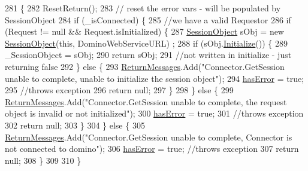 \begin{DoxyCode}
281                                                                 \{
282         ResetReturn();
283         \textcolor{comment}{// reset the error vars - will be populated by SessionObject}
284         \textcolor{keywordflow}{if} (\_isConnected) \{
285             \textcolor{comment}{//we have a valid Requestor}
286             \textcolor{keywordflow}{if} (Request != null && Request.isInitialized) \{
287                 \mbox{\hyperlink{class_session_object}{SessionObject}} sObj = \textcolor{keyword}{new} \mbox{\hyperlink{class_connector_a0a7bb42f9530796c086ab50785147ce9}{SessionObject}}(\textcolor{keyword}{this}, DominoWebServiceURL)
      ;
288                 \textcolor{keywordflow}{if} (sObj.\mbox{\hyperlink{class_session_object_af3b9c9d56d98c848061952ed935f815b}{Initialize}}()) \{
289                     \_SessionObject = sObj;
290                     \textcolor{keywordflow}{return} sObj;
291                     \textcolor{comment}{//not written in initialize - just returning false}
292                 \} \textcolor{keywordflow}{else} \{
293                     \mbox{\hyperlink{class_connector_a1ed422674b344524fd77998dcf6a9ba6}{ReturnMessages}}.Add(\textcolor{stringliteral}{"Connector.GetSession unable to complete, unable to
       initialize the session object"});
294                     \mbox{\hyperlink{class_connector_a079bae21a5417efa53bfe8954c0f533f}{hasError}} = \textcolor{keyword}{true};
295                     \textcolor{comment}{//throws exception}
296                     \textcolor{keywordflow}{return} null;
297                 \}
298             \} \textcolor{keywordflow}{else} \{
299                 \mbox{\hyperlink{class_connector_a1ed422674b344524fd77998dcf6a9ba6}{ReturnMessages}}.Add(\textcolor{stringliteral}{"Connector.GetSession unable to complete, the request
       object is invalid or not initialized"});
300                 \mbox{\hyperlink{class_connector_a079bae21a5417efa53bfe8954c0f533f}{hasError}} = \textcolor{keyword}{true};
301                 \textcolor{comment}{//throws exception}
302                 \textcolor{keywordflow}{return} null;
303             \}
304         \} \textcolor{keywordflow}{else} \{
305             \mbox{\hyperlink{class_connector_a1ed422674b344524fd77998dcf6a9ba6}{ReturnMessages}}.Add(\textcolor{stringliteral}{"Connector.GetSession unable to complete, Connector is not
       connected to domino"});
306             \mbox{\hyperlink{class_connector_a079bae21a5417efa53bfe8954c0f533f}{hasError}} = \textcolor{keyword}{true};  \textcolor{comment}{//throws exception}
307             \textcolor{keywordflow}{return} null;
308         \}
309 
310     \}
\end{DoxyCode}
\mbox{\label{class_connector_a2ceb19719cfc04adc4c2d299e19e1447}} 
